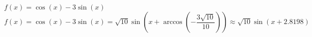  {$f(x) = \cos(x) - 3\sin(x)$}
{ $f(x) = \cos(x) - 3\sin(x) = \sqrt{10} \sin\left(x + \arccos\left(-\dfrac{3\sqrt{10}}{10} \right)\right) \approx \sqrt{10} \sin(x + 2.8198)$}

